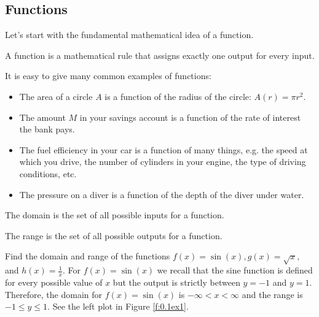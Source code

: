 \subsection*{Functions}
Let's start with the fundamental mathematical idea of a function.  
\begin{definition}[Function]
    A function is a mathematical rule that assigns exactly one output for every
    input.  
% 
\end{definition}

It is easy to give many common examples of functions:
\begin{itemize}
    \item The area of a circle $A$ is a function of the radius of the circle:  $A(r)= \pi r^2$.
    \item The amount $M$ in your savings account is a function of the rate of interest the
        bank pays.
    \item The fuel efficiency in your car is a function of many things, e.g. the speed at
        which you drive, the number of cylinders in your engine, the type of driving
        conditions, etc.
    \item The pressure on a diver is a function of the depth of the diver under water.
\end{itemize}

\begin{definition}
    The domain is the set of all possible inputs for a function.
\end{definition}

\begin{definition}
    The range is the set of all possible outputs for a function.
\end{definition}

\bex
Find the domain and range of the functions $f(x) = \sin(x), g(x) = \sqrt{x},$ and $h(x) =
    \frac{1}{x}$.
\eex
For $f(x)=\sin(x)$ we recall that the sine function is defined for every possible value of $x$ but
the output is strictly between $y=-1$ and $y=1$.  Therefore, the domain for $f(x) =
\sin(x)$ is $-\infty < x < \infty$ and the range is $-1 \le y \le 1$.  See the left plot
in Figure \ref{f:0.1ex1}.

